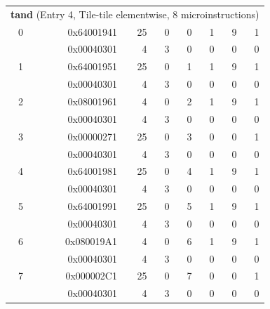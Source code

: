 \begin{longtable}{r r r r r r r r}
\multicolumn{8}{l}{\textbf{tand} (Entry 4, Tile-tile elementwise, 8 microinstructions)} \\
0 & 0x64001941 & 25 & 0 & 0 & 1 & 9 & 1 \\
  & 0x00040301 & 4 & 3 & 0 & 0 & 0 & 0 \\
1 & 0x64001951 & 25 & 0 & 1 & 1 & 9 & 1 \\
  & 0x00040301 & 4 & 3 & 0 & 0 & 0 & 0 \\
2 & 0x08001961 & 4 & 0 & 2 & 1 & 9 & 1 \\
  & 0x00040301 & 4 & 3 & 0 & 0 & 0 & 0 \\
3 & 0x00000271 & 25 & 0 & 3 & 0 & 0 & 1 \\
  & 0x00040301 & 4 & 3 & 0 & 0 & 0 & 0 \\
4 & 0x64001981 & 25 & 0 & 4 & 1 & 9 & 1 \\
  & 0x00040301 & 4 & 3 & 0 & 0 & 0 & 0 \\
5 & 0x64001991 & 25 & 0 & 5 & 1 & 9 & 1 \\
  & 0x00040301 & 4 & 3 & 0 & 0 & 0 & 0 \\
6 & 0x080019A1 & 4 & 0 & 6 & 1 & 9 & 1 \\
  & 0x00040301 & 4 & 3 & 0 & 0 & 0 & 0 \\
7 & 0x000002C1 & 25 & 0 & 7 & 0 & 0 & 1 \\
  & 0x00040301 & 4 & 3 & 0 & 0 & 0 & 0 \\


\end{longtable}
